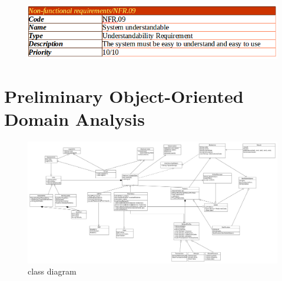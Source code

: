 \documentclass[]{article}
\begin{document}
\begin{figure}[H]
\centering
\includegraphics[scale=0.4]{./nonf/11}
\end{figure}

\section{Preliminary Object-Oriented Domain Analysis}

\begin{figure}[H]
\centering
\includegraphics[scale=0.18]{./classdiagram}
\caption{class diagram}
\end{figure}
\end{document}
